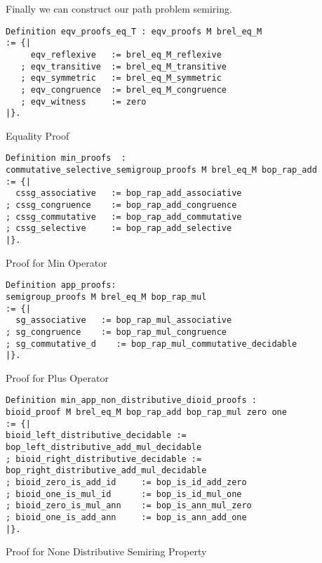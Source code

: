 Finally we can construct our path problem semiring.
\begin{listing}[H]
\begin{verbatim}
Definition eqv_proofs_eq_T : eqv_proofs M brel_eq_M
:= {| 
     eqv_reflexive   := brel_eq_M_reflexive
   ; eqv_transitive  := brel_eq_M_transitive
   ; eqv_symmetric   := brel_eq_M_symmetric
   ; eqv_congruence  := brel_eq_M_congruence
   ; eqv_witness     := zero
|}. 
\end{verbatim}
\caption{Equality Proof} 
\label{coq:proof:eqv_proofs_eq_T}
\end{listing}
\begin{listing}[H]
\begin{verbatim}
Definition min_proofs  : 
commutative_selective_semigroup_proofs M brel_eq_M bop_rap_add
:= {|
  cssg_associative   := bop_rap_add_associative
; cssg_congruence    := bop_rap_add_congruence
; cssg_commutative   := bop_rap_add_commutative
; cssg_selective     := bop_rap_add_selective                                       
|}.
\end{verbatim}
\caption{Proof for Min Operator} 
\label{coq:def:min_proofs}
\end{listing}
\begin{listing}[H]
\begin{verbatim}
Definition app_proofs: 
semigroup_proofs M brel_eq_M bop_rap_mul
:= {|
  sg_associative   := bop_rap_mul_associative
; sg_congruence    := bop_rap_mul_congruence
; sg_commutative_d    := bop_rap_mul_commutative_decidable                                                
|}.
\end{verbatim}
\caption{Proof for Plus Operator} 
\label{coq:def:app_proofs}
\end{listing}
\begin{listing}[H]
\begin{verbatim}
Definition min_app_non_distributive_dioid_proofs : 
bioid_proof M brel_eq_M bop_rap_add bop_rap_mul zero one
:= {|  
bioid_left_distributive_decidable := bop_left_distributive_add_mul_decidable
; bioid_right_distributive_decidable := bop_right_distributive_add_mul_decidable
; bioid_zero_is_add_id     := bop_is_id_add_zero
; bioid_one_is_mul_id      := bop_is_id_mul_one 
; bioid_zero_is_mul_ann    := bop_is_ann_mul_zero
; bioid_one_is_add_ann     := bop_is_ann_add_one
|}.
\end{verbatim}
\caption{Proof for None Distributive Semiring Property} 
\label{coq:def:min_app_non_distributive_dioid_proofs}
\end{listing}

